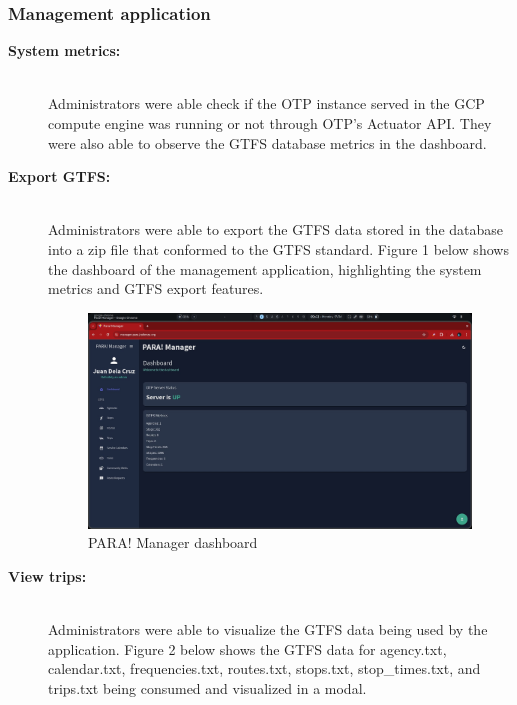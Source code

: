 \documentclass[journal]{./IEEE/IEEEtran}
\begin{document}
\subsubsection{\textbf{Management application}}

\begin{description}
    \item[\textbf{System metrics:}] \hfill \\
        Administrators were able check if the OTP instance served in the GCP compute engine was running or not through OTP's Actuator API. They were also able to observe the GTFS database metrics in the dashboard.
    
    \item[\textbf{Export GTFS:}] \hfill \\
        Administrators were able to export the GTFS data stored in the database into a zip file that conformed to the GTFS standard. Figure 1 below shows the dashboard of the management application, highlighting the system metrics and GTFS export features.

\begin{figure}[h]
    \centering
        \includegraphics[scale=0.115]{./figures/manager/dashboard.jpeg}
    \caption{PARA! Manager dashboard}
\end{figure}

\item[\textbf{View trips:}] \hfill \\
        Administrators were able to visualize the GTFS data being used by the application. Figure 2 below shows the GTFS data for agency.txt, calendar.txt, frequencies.txt, routes.txt, stops.txt, stop\_times.txt, and trips.txt being consumed and visualized in a modal. 


\end{description}
\end{document}
